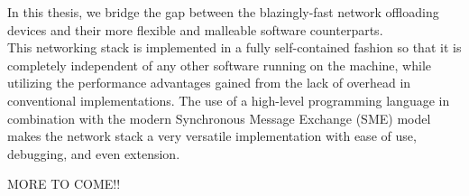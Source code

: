 In this thesis, we bridge the gap between the blazingly-fast network offloading
devices and their more flexible and malleable software counterparts.\\
This networking stack is implemented in a fully self-contained fashion so that
it is completely independent of any other software running on the machine, while
utilizing the performance advantages gained from the lack of overhead in
conventional implementations.
The use of a high-level programming language in combination with the modern
Synchronous Message Exchange (SME) model makes the network stack a very versatile
implementation with ease of use, debugging, and even extension.




MORE TO COME!!




